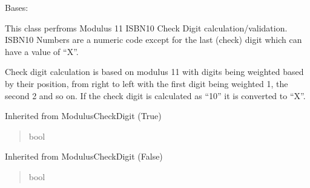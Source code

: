 \documentclass[letterpaper,10pt,english]{sphinxmanual}
\begin{document}
\begin{fulllineitems}
\label{\detokenize{apache_commons_validator_python.routines.checkdigit:apache_commons_validator_python.routines.checkdigit.isbn10_checkdigit.ISBN10CheckDigit}}
\pysigstartsignatures
{}
\pysigstopsignatures
\sphinxAtStartPar
Bases: 

\sphinxAtStartPar
This class perfroms Modulus 11 ISBN\sphinxhyphen{}10 Check Digit calculation/validation.
ISBN\sphinxhyphen{}10 Numbers are a numeric code except for the last (check) digit which can have
a value of “X”.

\sphinxAtStartPar
Check digit calculation is based on modulus 11 with digits being weighted based by their position,
from right to left  with the first digit being weighted 1, the second 2 and so on.
If the check digit is calculated as “10” it is converted to “X”.

\begin{fulllineitems}
\label{\detokenize{apache_commons_validator_python.routines.checkdigit:apache_commons_validator_python.routines.checkdigit.isbn10_checkdigit.ISBN10CheckDigit.serializable}}
\pysigstartsignatures
{}
\pysigstopsignatures
\sphinxAtStartPar
Inherited from ModulusCheckDigit (True)
\begin{quote}\begin{description}
\sphinxAtStartPar
bool

\end{description}\end{quote}

\end{fulllineitems}


\begin{fulllineitems}
\label{\detokenize{apache_commons_validator_python.routines.checkdigit:apache_commons_validator_python.routines.checkdigit.isbn10_checkdigit.ISBN10CheckDigit.clone}}
\pysigstartsignatures
{}
\pysigstopsignatures
\sphinxAtStartPar
Inherited from ModulusCheckDigit (False)
\begin{quote}\begin{description}
\sphinxAtStartPar
bool


\end{description}
\end{quote}
\end{fulllineitems}
\end{fulllineitems}
\end{document}
